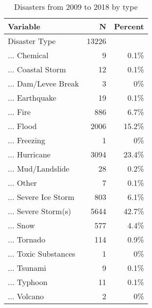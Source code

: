 \begin{table}[!h] \centering \renewcommand*{\arraystretch}{1.1}\caption{Disasters from 2009 to 2018 by type}\label{DisasterTypes}
\begin{tabular}{lrr}
\hline
\hline
Variable & N & Percent \\ 
\hline
Disaster Type & 13226 &  \\ 
... Chemical & 9 & 0.1\% \\ 
... Coastal Storm & 12 & 0.1\% \\ 
... Dam/Levee Break & 3 & 0\% \\ 
... Earthquake & 19 & 0.1\% \\ 
... Fire & 886 & 6.7\% \\ 
... Flood & 2006 & 15.2\% \\ 
... Freezing & 1 & 0\% \\ 
... Hurricane & 3094 & 23.4\% \\ 
... Mud/Landslide & 28 & 0.2\% \\ 
... Other & 7 & 0.1\% \\ 
... Severe Ice Storm & 803 & 6.1\% \\ 
... Severe Storm(s) & 5644 & 42.7\% \\ 
... Snow & 577 & 4.4\% \\ 
... Tornado & 114 & 0.9\% \\ 
... Toxic Substances & 1 & 0\% \\ 
... Tsunami & 9 & 0.1\% \\ 
... Typhoon & 11 & 0.1\% \\ 
... Volcano & 2 & 0\%\\ 
\hline
\hline
\end{tabular}
\end{table}

